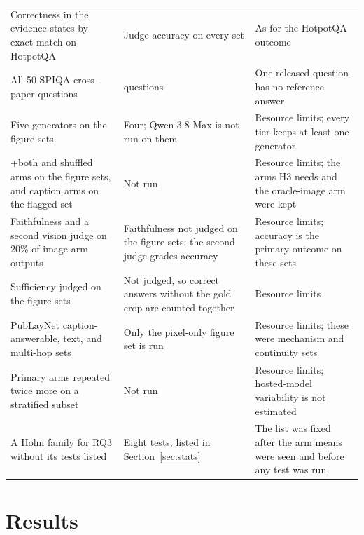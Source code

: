 \documentclass[preprint,12pt]{elsarticle}
\newif\ifdraftnotes
\newcommand{\note}[1]{\ifdraftnotes\par\smallskip\noindent\fcolorbox{black!40}{black!4}{\parbox{\dimexpr\linewidth-2\fboxsep-2\fboxrule}{\footnotesize\textbf{Writer note.} #1}}\par\smallskip\fi}
\begin{document}
\begin{table}[!tbp]
\begin{tabular}{@{}>{\raggedright\arraybackslash}p{}>{\raggedright\arraybackslash}p{}>{\raggedright\arraybackslash}p{}@{}}
Correctness in the evidence states by exact match on HotpotQA & Judge accuracy on every set & As for the HotpotQA outcome \\
All 50 SPIQA cross-paper questions & 49 questions & One released question has no reference answer \\
Five generators on the figure sets & Four; Qwen 3.8 Max is not run on them & Resource limits; every tier keeps at least one generator \\
+both and shuffled arms on the figure sets, and caption arms on the flagged set & Not run & Resource limits; the arms H3 needs and the oracle-image arm were kept \\
Faithfulness and a second vision judge on 20\% of image-arm outputs & Faithfulness not judged on the figure sets; the second judge grades accuracy & Resource limits; accuracy is the primary outcome on these sets \\
Sufficiency judged on the figure sets & Not judged, so correct answers without the gold crop are counted together & Resource limits \\
PubLayNet caption-answerable, text, and multi-hop sets & Only the pixel-only figure set is run & Resource limits; these were mechanism and continuity sets \\
Primary arms repeated twice more on a stratified subset & Not run & Resource limits; hosted-model variability is not estimated \\
A Holm family for RQ3 without its tests listed & Eight tests, listed in Section~\ref{sec:stats} & The list was fixed after the arm means were seen and before any test was run \\\bottomrule
\end{tabular}
\end{table}

\section{Results}
\label{sec:results}

\note{Every HotpotQA number in this section comes from \texttt{rag
pooled-analysis} reports re-adjusted with \texttt{rag holm-family} and turned
into table rows by \texttt{docs/paper\_tables.py}; the evidence states come
from \texttt{rag evidence-states}. Report the same statistics for
unfavourable comparisons as for favourable ones.}
\end{document}
